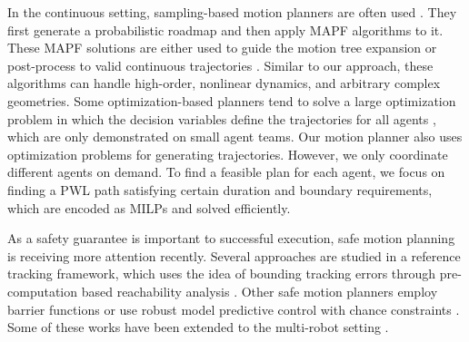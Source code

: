 \documentclass[letterpaper]{article} %
\theoremstyle{definition}
\begin{document}
In the continuous setting, sampling-based motion planners are often used \cite{le2018cooperative,honig2018trajectory}. They first generate a probabilistic roadmap and then apply MAPF algorithms to it. These MAPF solutions are either used to guide the motion tree expansion \cite{le2018cooperative} or post-process to valid continuous trajectories \cite{honig2018trajectory}. Similar to our approach, these algorithms can handle high-order, nonlinear dynamics, and arbitrary complex geometries. Some optimization-based planners tend to solve a large optimization problem in which the decision variables define the trajectories for all agents \cite{augugliaro2012generation,mellinger2012mixed}, which are only demonstrated on small agent teams. %
Our motion planner also uses optimization problems for generating trajectories. However, we only coordinate different agents on demand. To find a feasible plan for each agent, we focus on finding a PWL path satisfying certain duration and boundary requirements, which are encoded as MILPs and solved efficiently.


As a safety guarantee is important to successful execution, safe motion planning is receiving more attention recently. Several approaches are studied in a reference tracking framework, which uses the idea of bounding tracking errors through pre-computation based reachability analysis \cite{herbert2017fastrack,singh2017robust,vaskov2019towards,fan2020fast,majumdar2017funnel}. Other safe motion planners employ barrier functions \cite{barry2012safety,agrawal2017discrete} or use robust model predictive control with chance constraints \cite{blackmore2011chance,jasour2019sequential,yu2013tube}. Some of these works have been extended to the multi-robot setting \cite{wang2016safety,panagou2013multi,srinivasan2018control,desai2019soter,abs-1811-09914,richards2004decentralized}. %
\end{document}
